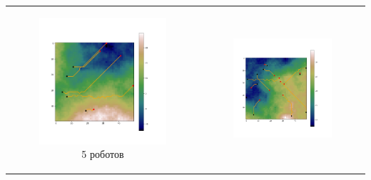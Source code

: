 \documentclass{article}
\begin{document}
	\begin{table}[H]
		\begin{tabular}{c c}
			\begin{subfigure}{0.5\linewidth}
				\includegraphics[width = 1.0\columnwidth]{data/mean_paths/50x50/5.png}
			\caption*{5 роботов}
			\end{subfigure}
			&
			\begin{subfigure}{0.5\linewidth}
				\includegraphics[width = 1.0\columnwidth]{data/mean_paths/50x50/10.png}

\end{subfigure}
\end{tabular}
\end{table}
\end{document}
